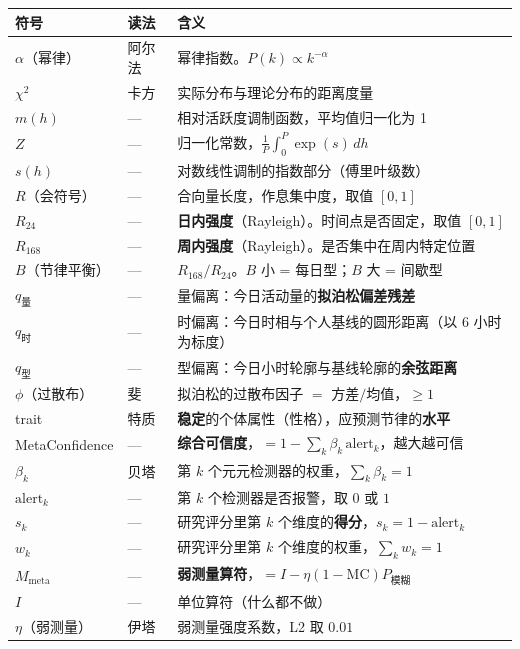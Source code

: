 \documentclass[UTF8,a4paper,11pt]{ctexart}
\begin{document}
\begin{longtable}{@{}p{2.8cm}p{2.2cm}p{9.6cm}@{}}
\toprule
\textbf{符号} & \textbf{读法} & \textbf{含义} \\
\midrule
\endhead
$\alpha$（幂律） & 阿尔法 & 幂律指数。$P(k) \propto k^{-\alpha}$ \\
$\chi^2$ & 卡方 & 实际分布与理论分布的距离度量 \\
$m(h)$ & --- & 相对活跃度调制函数，平均值归一化为 1 \\
$Z$ & --- & 归一化常数，$\frac{1}{P}\int_0^P \exp(s)\,dh$ \\
$s(h)$ & --- & 对数线性调制的指数部分（傅里叶级数） \\
$R$（会符号） & --- & 合向量长度，作息集中度，取值 $[0,1]$ \\
$R_{24}$ & --- & \textbf{日内强度}（Rayleigh）。时间点是否固定，取值 $[0,1]$ \\
$R_{168}$ & --- & \textbf{周内强度}（Rayleigh）。是否集中在周内特定位置 \\
$B$（节律平衡） & --- & $R_{168}/R_{24}$。$B$ 小 = 每日型；$B$ 大 = 间歇型 \\
$q_{\text{量}}$ & --- & 量偏离：今日活动量的\textbf{拟泊松偏差残差} \\
$q_{\text{时}}$ & --- & 时偏离：今日时相与个人基线的圆形距离（以 6 小时为标度）\\
$q_{\text{型}}$ & --- & 型偏离：今日小时轮廓与基线轮廓的\textbf{余弦距离} \\
$\phi$（过散布） & 斐 & 拟泊松的过散布因子 $=$ 方差$/ $均值，$\ge 1$ \\
trait & 特质 & \textbf{稳定}的个体属性（性格），应预测节律的\textbf{水平} \\
MetaConfidence & --- & \textbf{综合可信度}，$=1-\sum_k\beta_k\,\mathrm{alert}_k$，越大越可信 \\
$\beta_k$ & 贝塔 & 第 $k$ 个元元检测器的权重，$\sum_k\beta_k=1$ \\
$\mathrm{alert}_k$ & --- & 第 $k$ 个检测器是否报警，取 $0$ 或 $1$ \\
$s_k$ & --- & 研究评分里第 $k$ 个维度的\textbf{得分}，$s_k=1-\mathrm{alert}_k$ \\
$w_k$ & --- & 研究评分里第 $k$ 个维度的权重，$\sum_k w_k=1$ \\
$M_{\text{meta}}$ & --- & \textbf{弱测量算符}，$=I-\eta(1-\text{MC})P_{\text{模糊}}$ \\
$I$ & --- & 单位算符（什么都不做）\\
$\eta$（弱测量） & 伊塔 & 弱测量强度系数，L2 取 $0.01$ \\

\end{longtable}
\end{document}
